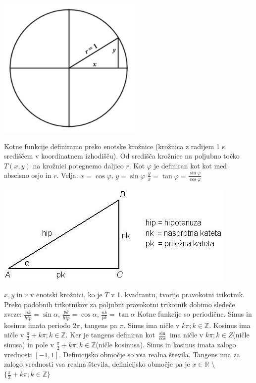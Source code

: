 \documentclass[12pt]{report}
\newcommand{\R}{\mathbb{R}}
\newcommand{\Z}{\mathbb{Z}}
\begin{document}
\begin{slika}[H]
  \centering
  \includegraphics[width = 7cm]{18}
\end{slika}

Kotne funkcije definiramo preko enotske krožnice (krožnica z radijem 1 s središčem v koordinatnem izhodišču). Od središča krožnice na poljubno točko $T(x, y)$ na krožnici potegnemo daljico $r$. Kot $\varphi$ je definiran kot kot med abscisno osjo in $r$. Velja: $x=\cos\varphi$, $y=\sin\varphi$ $\frac{y}{x}=\tan\varphi=\frac{\sin\varphi}{\cos\varphi}$

 \begin{slika}[H]
  \centering
  \includegraphics[width = \textwidth]{19}
\end{slika}

$x, y$ in $r$ v enotski krožnici, ko je $T$ v 1. kvadrantu, tvorijo pravokotni trikotnik. Preko podobnih trikotnikov za poljubni pravokotni trikotnik dobimo sledeče zveze: $\frac{nk}{hip} = \sin\alpha$, $\frac{pk}{hip} = \cos\alpha$, $\frac{nk}{pk} = \tan\alpha$
\bigbreak
Kotne funkcije so periodične. Sinus in kosinus imata periodo $2\pi$, tangens pa $\pi$. Sinus ima ničle v $k\pi;k\in \Z$. Kosinus ima ničle v $\frac{\pi}{2}+k\pi; k\in \Z$. Ker je tangens definiran kot $\frac{\sin}{\cos}$ ima ničle v $k\pi; k\in Z$(ničle sinusa) in pole v $\frac{\pi}{2}+k\pi; k\in \Z$(ničle kosinusa). Sinus in kosinus imata zalogo vrednosti $[-1, 1]$. Definicijsko območje so vsa realna števila. Tangens ima za zalogo vrednosti vsa realna števila, definicijsko območje pa je $x\in \R$ \textbackslash $\{\frac{\pi}{2}+k\pi; k\in \Z\}$
\end{document}

